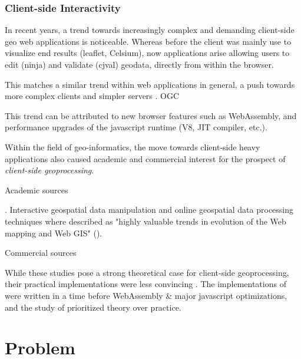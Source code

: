 \subsubsection*{Client-side Interactivity}
In recent years, a trend towards increasingly complex and demanding client-side geo web applications is noticeable.  
Whereas before the client was mainly use to visualize end results (leaflet, Celsium), now applications arise allowing users to edit (ninja) and validate (cjval) geodata, directly from within the browser. 


This matches a similar trend within web applications in general, a push towards more complex clients and simpler servers \cite{panidi_hybrid_2015}.
OGC

This trend can be attributed to new browser features such as WebAssembly, and performance upgrades of the javascript runtime (V8, JIT compiler, etc.).

Within the field of geo-informatics, the move towards client-side heavy applications also caused academic and commercial interest for the prospect of \emph{client-side geoprocessing}. 

Academic sources 

\cite{kulawiak_analysis_2019, panidi_hybrid_2015, hamilton_client-side_2014}. 
Interactive geospatial data manipulation and online geospatial data processing techniques where described as "highly valuable trends in evolution of the Web mapping and Web GIS" (\cite{panidi_hybrid_2015}).


Commercial sources 

While these studies pose a strong theoretical case for client-side geoprocessing, their practical implementations were less convincing . 
The implementations of \cite{panidi_hybrid_2015, hamilton_client-side_2014} were written in a time before WebAssembly \& major javascript optimizations, and the study of \cite{kulawiak_analysis_2019} prioritized theory over practice. 

\section{ Problem }


